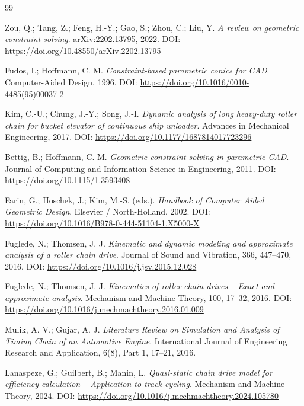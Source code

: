 \documentclass[12pt,a4paper]{article}
\begin{document}
\newpage
\begin{thebibliography}{99}

Zou, Q.; Tang, Z.; Feng, H.-Y.; Gao, S.; Zhou, C.; Liu, Y.
\textit{A review on geometric constraint solving}.
arXiv:2202.13795, 2022.
DOI: \url{https://doi.org/10.48550/arXiv.2202.13795}

Fudos, I.; Hoffmann, C. M.
\textit{Constraint-based parametric conics for CAD}.
Computer-Aided Design, 1996.
DOI: \url{https://doi.org/10.1016/0010-4485(95)00037-2}

Kim, C.-U.; Chung, J.-Y.; Song, J.-I.
\textit{Dynamic analysis of long heavy-duty roller chain for bucket elevator of continuous ship unloader}.
Advances in Mechanical Engineering, 2017.
DOI: \url{https://doi.org/10.1177/1687814017723296}

Bettig, B.; Hoffmann, C. M.
\textit{Geometric constraint solving in parametric CAD}.
Journal of Computing and Information Science in Engineering, 2011.
DOI: \url{https://doi.org/10.1115/1.3593408}

Farin, G.; Hoschek, J.; Kim, M.-S. (eds.).
\textit{Handbook of Computer Aided Geometric Design}.
Elsevier / North-Holland, 2002.
DOI: \url{https://doi.org/10.1016/B978-0-444-51104-1.X5000-X}

Fuglede, N.; Thomsen, J. J.
\textit{Kinematic and dynamic modeling and approximate analysis of a roller chain drive}.
Journal of Sound and Vibration, 366, 447--470, 2016.
DOI: \url{https://doi.org/10.1016/j.jsv.2015.12.028}

Fuglede, N.; Thomsen, J. J.
\textit{Kinematics of roller chain drives -- Exact and approximate analysis}.
Mechanism and Machine Theory, 100, 17--32, 2016.
DOI: \url{https://doi.org/10.1016/j.mechmachtheory.2016.01.009}

Mulik, A. V.; Gujar, A. J.
\textit{Literature Review on Simulation and Analysis of Timing Chain of an Automotive Engine}.
International Journal of Engineering Research and Application, 6(8), Part 1, 17--21, 2016.

Lanaspeze, G.; Guilbert, B.; Manin, L.
\textit{Quasi-static chain drive model for efficiency calculation -- Application to track cycling}.
Mechanism and Machine Theory, 2024.
DOI: \url{https://doi.org/10.1016/j.mechmachtheory.2024.105780}

\end{thebibliography}
\end{document}

